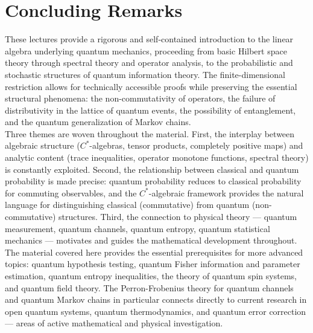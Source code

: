 \documentclass[11pt,a4paper]{article}
\begin{document}
\section{Concluding Remarks}
\label{sec:concluding remarks}
These lectures provide a rigorous and self-contained introduction to the linear algebra underlying quantum mechanics, proceeding from basic Hilbert space theory through spectral theory and operator analysis, to the probabilistic and stochastic structures of quantum information theory. The finite-dimensional restriction allows for technically accessible proofs while preserving the essential structural phenomena: the non-commutativity of operators, the failure of distributivity in the lattice of quantum events, the possibility of entanglement, and the quantum generalization of Markov chains. \\

Three themes are woven throughout the material. First, the interplay between algebraic structure ($C^*$-algebras, tensor products, completely positive maps) and analytic content (trace inequalities, operator monotone functions, spectral theory) is constantly exploited. Second, the relationship between classical and quantum probability is made precise: quantum probability reduces to classical probability for commuting observables, and the $C^*$-algebraic framework provides the natural language for distinguishing classical (commutative) from quantum (non-commutative) structures. Third, the connection to physical theory — quantum measurement, quantum channels, quantum entropy, quantum statistical mechanics — motivates and guides the mathematical development throughout. \\

The material covered here provides the essential prerequisites for more advanced topics: quantum hypothesis testing, quantum Fisher information and parameter estimation, quantum entropy inequalities, the theory of quantum spin systems, and quantum field theory. The Perron-Frobenius theory for quantum channels and quantum Markov chains in particular connects directly to current research in open quantum systems, quantum thermodynamics, and quantum error correction — areas of active mathematical and physical investigation.
\end{document}
